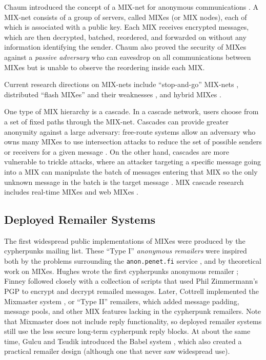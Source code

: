 \documentclass{llncs}
\begin{document}
Chaum introduced the concept of a MIX-net for anonymous communications
\cite{chaum-mix}. A MIX-net consists of a group of servers, called
MIXes (or MIX nodes), each of which is associated with a public
key. Each MIX receives encrypted messages, which are then decrypted,
batched, reordered, and forwarded on without any information
identifying the sender. Chaum also proved the security of MIXes
against a \emph{passive adversary} who can eavesdrop on all
communications between MIXes but is unable to observe the reordering
inside each MIX.

Current research directions on MIX-nets include ``stop-and-go'' MIX-nets
\cite{kesdogan}, distributed ``flash MIXes'' \cite{flash-mix} and their
weaknesses \cite{desmedt,mitkuro}, and hybrid MIXes \cite{hybrid-mix}.

One type of MIX hierarchy is a cascade.
In a cascade network, users choose from a set of fixed paths through
the MIX-net.
Cascades can provide greater anonymity against a large adversary:
free-route systems allow an adversary who owns many MIXes to use
intersection attacks to reduce the set of possible senders or receivers
for a given
message \cite{disad-free-routes}. On the other hand, cascades are more
vulnerable \cite{batching-taxonomy} to trickle attacks, where an attacker
targeting a specific message going into a MIX can manipulate the batch
of messages entering that MIX so the only unknown message in the batch
is the target message \cite{mixmaster-attacks,babel}.
MIX cascade research includes real-time MIXes \cite{realtime-mix} and
web MIXes \cite{web-mix}.

\subsection{Deployed Remailer Systems}

The first widespread public implementations of MIXes were produced by the
cypherpunks mailing list. These ``Type I'' \emph{anonymous remailers}
were inspired both by the problems surrounding the {\tt anon.penet.fi}
service \cite{helsingius}, and by theoretical work on MIXes. Hughes wrote
the first cypherpunks anonymous remailer \cite{remailer-history}; Finney
followed closely with a collection of scripts that used Phil Zimmermann's
PGP to encrypt and decrypt remailed messages. Later, Cottrell implemented
the Mixmaster system \cite{mixmaster}, or ``Type II'' remailers, which
added message padding, message pools, and other MIX features lacking
in the cypherpunk remailers. Note that Mixmaster does not include reply
functionality, so deployed remailer systems still use the less secure
long-term cypherpunk reply blocks. At about the same time, Gulcu and
Tsudik introduced the Babel system \cite{babel}, which also created a
practical remailer design (although one that never saw widespread use).
\end{document}

